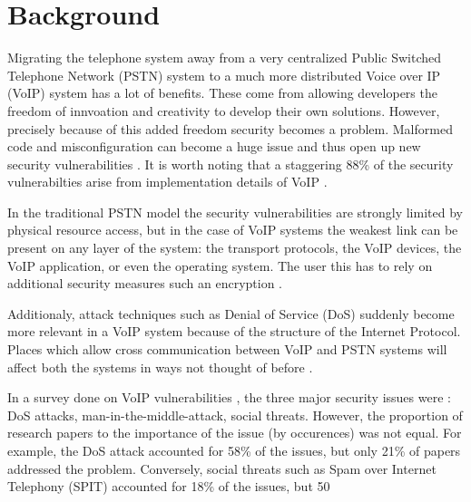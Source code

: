 \section{Background}


Migrating the telephone system away from a very centralized Public Switched Telephone Network (PSTN) system to a much more distributed Voice over IP (VoIP) system has a lot of benefits. These come from allowing developers the freedom of innvoation and creativity to develop their own solutions. However, precisely because of this added freedom security becomes a problem. Malformed code and misconfiguration can become a huge issue and thus open up new security vulnerabilities \cite{voipbg}. It is worth noting that a staggering 88\% of the security vulnerabilties arise from implementation details of VoIP \cite{keromytis}.

In the traditional PSTN model the security vulnerabilities are strongly limited by physical resource access, but in the case of VoIP systems the weakest link can be present on any layer of the system: the transport protocols, the VoIP devices, the VoIP application, or even the operating system. The user this has to rely on additional security measures such an encryption \cite{voipbg}. 

Additionaly, attack techniques such as Denial of Service (DoS) suddenly become more relevant in a VoIP system because of the structure of the Internet Protocol. Places which allow cross communication between VoIP and PSTN systems will affect both the systems in ways not thought of before \cite{voipbg}.

In a survey done on VoIP vulnerabilities \cite{keromytis}, the three major security issues were : DoS attacks, man-in-the-middle-attack, social threats. However, the proportion of research papers to the importance of the issue (by occurences) was not equal. For example, the DoS attack accounted for 58\% of the issues, but only 21\% of papers addressed the problem. Conversely, social threats such as Spam over Internet Telephony (SPIT) accounted for 18\% of the issues, but 50%

